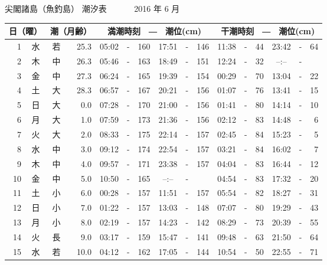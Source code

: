\documentclass[12pt.a4j]{jsarticle}
\begin{document}
\begin{center}
\begin{table}[ht]
\begin{tabular}{|rc|cr|ccrccr|ccrccr|}
   \hline
   \end{tabular}
\end{table}
\newpage
 {\LARGE 尖閣諸島（魚釣島）  潮汐表　　　}
 {\large 2016 年  6 月}\\
 \begin{table}[ht]
    \begin{tabular}{|rc|cr|ccrccr|ccrccr|}
    \hline
    \multicolumn{2}{|c|}{日（曜）} & \multicolumn{2}{c|}{潮（月齢）} & \multicolumn{6}{c|}{満潮時刻　―　潮位(cm)} & \multicolumn{6}{c|}{干潮時刻　―　潮位(cm)} \\
 \hline
 1 & 水 & 若 & 25.3 &  05:02 &-& 160  &  17:51 &-& 146  &   11:38 &-&  44  &   23:42 &-&  64  \\
 2 & 木 & 中 & 26.3 &  05:46 &-& 163  &  18:49 &-& 151  &   12:24 &-&  32  &   --:-- &-&     \\
 3 & 金 & 中 & 27.3 &  06:24 &-& 165  &  19:39 &-& 154  &   00:29 &-&  70  &   13:04 &-&  22  \\
 4 & 土 & 大 & 28.3 &  06:57 &-& 167  &  20:21 &-& 156  &   01:07 &-&  76  &   13:41 &-&  15  \\
 5 & 日 & 大 &  0.0 &  07:28 &-& 170  &  21:00 &-& 156  &   01:41 &-&  80  &   14:14 &-&  10  \\
 6 & 月 & 大 &  1.0 &  07:59 &-& 173  &  21:36 &-& 156  &   02:12 &-&  83  &   14:48 &-&   6  \\
 7 & 火 & 大 &  2.0 &  08:33 &-& 175  &  22:14 &-& 157  &   02:45 &-&  84  &   15:23 &-&   5  \\
 8 & 水 & 中 &  3.0 &  09:12 &-& 174  &  22:54 &-& 157  &   03:21 &-&  84  &   16:02 &-&   7  \\
 9 & 木 & 中 &  4.0 &  09:57 &-& 171  &  23:38 &-& 157  &   04:04 &-&  83  &   16:44 &-&  12  \\
10 & 金 & 中 &  5.0 &  10:50 &-& 165  &  --:-- &-&     &   04:54 &-&  83  &   17:32 &-&  20  \\
11 & 土 & 小 &  6.0 &  00:28 &-& 157  &  11:51 &-& 157  &   05:54 &-&  82  &   18:27 &-&  31  \\
12 & 日 & 小 &  7.0 &  01:22 &-& 157  &  13:03 &-& 148  &   07:07 &-&  80  &   19:29 &-&  43  \\
13 & 月 & 小 &  8.0 &  02:19 &-& 157  &  14:23 &-& 142  &   08:29 &-&  73  &   20:39 &-&  55  \\
14 & 火 & 長 &  9.0 &  03:17 &-& 159  &  15:47 &-& 141  &   09:48 &-&  63  &   21:50 &-&  64  \\
15 & 水 & 若 & 10.0 &  04:12 &-& 162  &  17:05 &-& 144  &   10:54 &-&  50  &   22:55 &-&  71  \\

\end{tabular}
\end{table}
\end{center}
\end{document}
